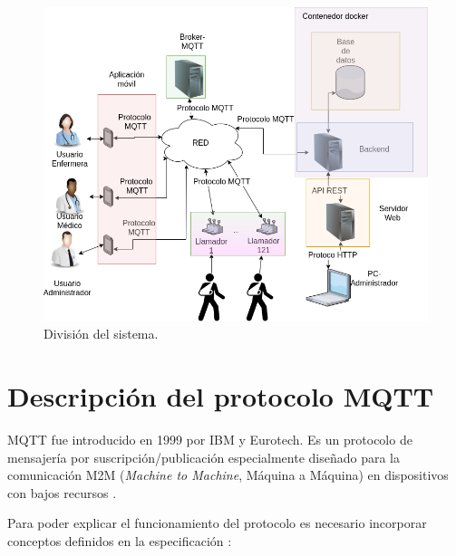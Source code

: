 \begin{figure}[ht]
	\centering
	\includegraphics[scale=.45]{./Figures/DiagramaSistemaOrganizado.png}
	\caption{División del sistema.}
	\label{fig:División del sistema}
\end{figure}

\pagebreak

\section{Descripción del protocolo MQTT}
\label{sec:Descripción del protocolo MQTT}

MQTT fue introducido en 1999 por IBM y Eurotech. Es un protocolo de mensajería por suscripción/publicación especialmente diseñado para la comunicación M2M (\textit{Machine to Machine}, Máquina a Máquina) en dispositivos con bajos recursos \citep{WEBSITE:5}.

Para poder explicar el funcionamiento del protocolo es necesario incorporar conceptos definidos en la especificación \citep{WEBSITE:5}:


